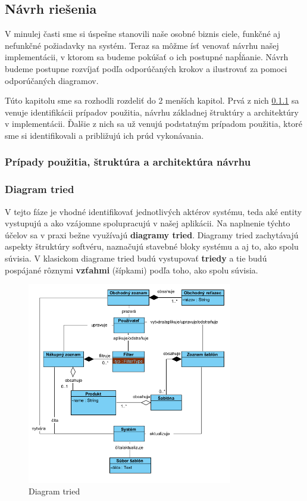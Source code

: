 \documentclass[twoside,slovak, a4paper]{article}
\begin{document}
\subsection{Návrh riešenia}

V minulej časti sme si úspešne stanovili naše osobné biznis ciele, funkčné aj nefunkčné požiadavky na systém. Teraz sa môžme ísť venovať návrhu našej implementácii, v ktorom sa budeme pokúšať o ich postupné napĺňanie. Návrh budeme postupne rozvíjať podľa odporúčaných krokov a ilustrovať za pomoci odporúčaných diagramov.

Túto kapitolu sme sa rozhodli rozdeliť do 2 menších kapitol. Prvá z nich \ref{UCSAD} sa venuje identifikácii prípadov použitia, návrhu základnej štruktúry a architektúry v implementácii. Ďalšie z nich sa už venujú podstatným prípadom použitia, ktoré sme si identifikovali a približujú ich prúd vykonávania.


\subsubsection{Prípady použitia, štruktúra a architektúra návrhu}\label{UCSAD}

\subsubsection*{Diagram tried}\label{CD}

V tejto fáze je vhodné identifikovať jednotlivých aktérov systému, teda aké entity vystupujú a ako vzájomne spolupracujú v našej aplikácii. Na naplnenie týchto účelov sa v praxi bežne využívajú \textbf{diagramy tried}. Diagramy tried zachytávajú aspekty štruktúry softvéru, naznačujú stavebné bloky systému a aj to, ako spolu súvisia.\cite{BERGSTROM2022111413} V klasickom diagrame tried budú vystupovať \textbf{triedy} a tie budú pospájané rôznymi \textbf{vzťahmi} (šípkami) podľa toho, ako spolu súvisia.

\begin{figure}[tbh]
    \centering
    \includegraphics[width=0.8\textwidth]{pics/design/class_diagram.png}
    \caption{Diagram tried}
    \label{fig:7}
\end{figure}
\end{document}
